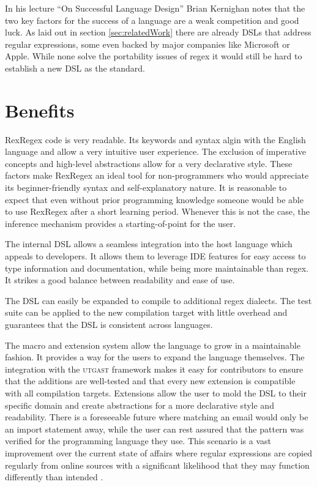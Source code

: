 In his lecture \enquote{On Successful Language Design} \cite{OnSuccessfulLanuageDesignKernighan} Brian Kernighan notes that the two key factors for the success of a language are a weak competition and good luck. As laid out in section \ref{sec:relatedWork} there are already DSLs that address regular expressions, some even backed by major companies like Microsoft or Apple. While none solve the portability issues of regex it would still be hard to establish a new DSL as the standard.

\section{Benefits}
 
RexRegex code is very readable. Its keywords and syntax algin with the English language and allow a very intuitive user experience. The exclusion of imperative concepts and high-level abstractions allow for a very declarative style. These factors make RexRegex an ideal tool for non-programmers who would appreciate its beginner-friendly syntax and self-explanatory nature. It is reasonable to expect that even without prior programming knowledge someone would be able to use RexRegex after a short learning period. Whenever this is not the case, the inference mechanism provides a starting-of-point for the user.

The internal DSL allows a seamless integration into the host language which appeals to developers. It allows them to leverage IDE features for easy access to type information and documentation, while being more maintainable than regex. It strikes a good balance between readability and ease of use.

The DSL can easily be expanded to compile to additional regex dialects. The test suite can be applied to the new compilation target with little overhead and guarantees that the DSL is consistent across languages.

The macro and extension system allow the language to grow in a maintainable fashion. It provides a way for the users to expand the language themselves. The integration with the \textsc{utgast} framework makes it easy for contributors to ensure that the additions are well-tested and that every new extension is compatible with all compilation targets. Extensions allow the user to mold the DSL to their specific domain and create abstractions for a more declarative style and readability. There is a foreseeable future where matching an email would only be an import statement away, while the user can rest assured that the pattern was verified for the programming language they use. This scenario is a vast improvement over the current state of affairs where regular expressions are copied regularly from online sources with a significant likelihood that they may function differently than intended \cite{RegexNotLinguaFranca}.

